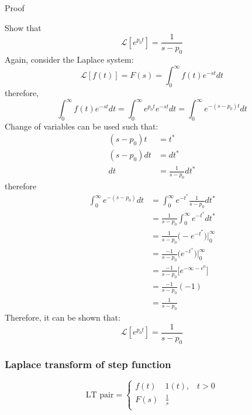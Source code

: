 \documentclass[12pt,letter]{article}
\numberwithin{ex}{section} %
\numberwithin{re}{section} %
\newcommand{\gr}[1]{\textcolor[rgb]{0.00,0.50,0.00}{#1}}
\newcommand{\Laplace}[1]{\ensuremath{\mathcal{L}{\left[#1\right]}}}
\numberwithin{equation}{section}	%
\begin{document}
\begin{mdframed}[middlelinewidth=0.5mm]
\begin{center}
\gr{Proof}
\end{center}
Show that
\begin{equation}
\Laplace{e^{p_0t}} = \frac{1}{s -p_0} 
\end{equation}
Again, consider the Laplace system:
\begin{equation}
		\Laplace{f(t)} = F(s) = \int_{0}^{\infty} f(t)e^{-st}dt
\end{equation}
therefore, 
\begin{equation}
	\int_{0}^{\infty}f(t)e^{-s t} dt =  \int_{0}^{\infty}e^{p_0t}e^{-st}dt = \int_{0}^{\infty}e^{-(s-p_0)t}dt
\end{equation}
Change of variables can be used such that:
\begin{align}
(s-p_0)t &= t^*  \\ \nonumber
(s-p_0)dt &= dt^*  \\ \nonumber
dt &= \frac{1}{s-p_0}dt^*
\end{align}
therefore
\begin{align}
	\int_{0}^{\infty}e^{-(s-p_0)} dt &=  \int_{0}^{\infty}e^{-t^*}\frac{1}{s-p_0}dt^*  \\ \nonumber
	&= \frac{1}{s-p_0} \int_{0}^{\infty}e^{-t^*} dt^*  \\ \nonumber
&= \frac{1}{s-p_0} \big(-e^{-t^*}\big) \bigg|^\infty_0 \\ \nonumber
&= \frac{-1}{s-p_0} \big(e^{-t^*}\big) \bigg|^\infty_0 \\ \nonumber
&= \frac{-1}{s-p_0} \big[e^{-\infty - e^0}\big] \\ \nonumber
&= \frac{-1}{s-p_0} (-1) \\ \nonumber
&= \frac{1}{s-p_0}
\end{align}
Therefore, it can be shown that:
\begin{equation}
\Laplace{e^{p_0t}} = \frac{1}{s -p_0} 
\end{equation}
\end{mdframed}



		\subsubsection{Laplace transform of step function}

		\begin{equation}
		\text{LT pair} =
			\begin{cases}
			f(t) & 1(t) , \; \; \; t>0 \\
			F(s) & \frac{1}{s} \\
			\end{cases}
		\end{equation}
\end{document}

